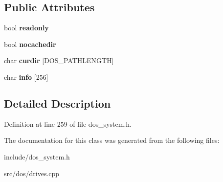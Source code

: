 \subsection*{Public Attributes}
\begin{DoxyCompactItemize}
\item 
\hypertarget{classDOS__Drive_aa7a3f21acf8787c1bad16d2c4fb5c53c}{bool {\bfseries readonly}}\label{classDOS__Drive_aa7a3f21acf8787c1bad16d2c4fb5c53c}

\item 
\hypertarget{classDOS__Drive_ab8a268c6350773fa0e8b8c000b691447}{bool {\bfseries nocachedir}}\label{classDOS__Drive_ab8a268c6350773fa0e8b8c000b691447}

\item 
\hypertarget{classDOS__Drive_a781fd315606de345f8eab325c2a17c2e}{char {\bfseries curdir} \mbox{[}D\-O\-S\-\_\-\-P\-A\-T\-H\-L\-E\-N\-G\-T\-H\mbox{]}}\label{classDOS__Drive_a781fd315606de345f8eab325c2a17c2e}

\item 
\hypertarget{classDOS__Drive_a3e2b1d7526c099ba38ba991b9d2623e1}{char {\bfseries info} \mbox{[}256\mbox{]}}\label{classDOS__Drive_a3e2b1d7526c099ba38ba991b9d2623e1}

\end{DoxyCompactItemize}


\subsection{Detailed Description}


Definition at line 259 of file dos\-\_\-system.\-h.



The documentation for this class was generated from the following files\-:\begin{DoxyCompactItemize}
\item 
include/dos\-\_\-system.\-h\item 
src/dos/drives.\-cpp\end{DoxyCompactItemize}
